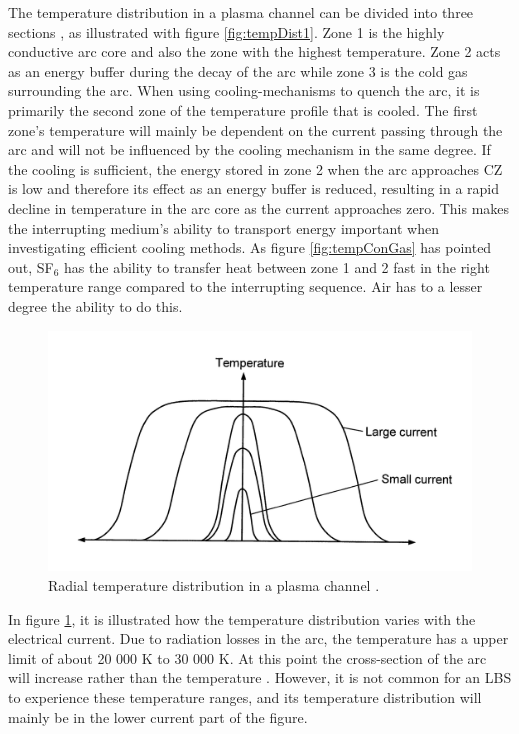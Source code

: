 \documentclass[10pt,a4paper,twoside]{article}
\begin{document}
The temperature distribution in a plasma channel can be divided into three sections \cite{bib:TDCIGBB}, as illustrated with figure \ref{fig:tempDist1}. Zone 1 is the highly conductive arc core and also the zone with the highest temperature. Zone 2 acts as an energy buffer during the decay of the arc while zone 3 is the cold gas surrounding the arc. When using cooling-mechanisms to quench the arc, it is primarily the second zone of the temperature profile that is cooled. The first zone's temperature will mainly be dependent on the current passing through the arc and will not be influenced by the cooling mechanism in the same degree. If the cooling is sufficient, the energy stored in zone 2 when the arc approaches CZ is low and therefore its effect as an energy buffer is reduced, resulting in a rapid decline in temperature in the arc core as the current approaches zero. This makes the interrupting medium's ability to transport energy important when investigating efficient cooling methods. As figure \ref{fig:tempConGas} has pointed out, SF$_6$ has the ability to transfer heat between zone 1 and 2 fast in the right temperature range compared to the interrupting sequence. Air has to a lesser degree the ability to do this.

\begin{figure}[H]
\centering
\includegraphics[scale=0.85]{Bilder/Theory/plasmaChannel1.png}
\caption{Radial temperature distribution in a plasma channel \cite{bib:HVEbreak}.} \label{fig:tempDist2}
\end{figure}

In figure \ref{fig:tempDist2}, it is illustrated how the temperature distribution varies with the electrical current. Due to radiation losses in the arc, the temperature has a upper limit of about 20 000 K to 30 000 K. At this point the cross-section of the arc will increase rather than the temperature \cite{bib:HVEbreak}. However, it is not common for an LBS to experience these temperature ranges, and its temperature distribution will mainly be in the lower current part of the figure.
\end{document}
